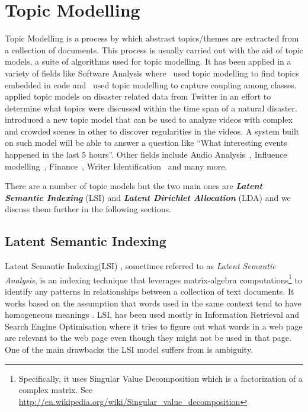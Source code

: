 \section{Topic Modelling}
\label{sec:bg-topic-modelling}
Topic Modelling is a process by which abstract topics/themes are extracted from a collection of
documents. This process is usually carried out with the aid of topic models, a suite of algorithms
used for topic modelling. It has been applied in a variety of fields like Software Analysis
where~\citet{linstead2009software} used topic modelling to find topics embedded in code
and~\citet{gethers2010using} used topic modelling to capture coupling among
classes.~\citet{kireyev2009applications} applied topic models on disaster related data from Twitter
in an effort to determine what topics were discussed within the time span of a natural
disaster.~\citet{hospedales2009markov} introduced a new topic model that can be used to analyze
videos with complex and crowded scenes in other to discover regularities in the videos. A system
built on such model will be able to answer a question like ``What interesting events happened in the
last 5 hours''. Other fields include Audio Analysis~\citep{smaragdis2009topic}, Influence
modelling~\citep{gerrish2009modeling}, Finance~\citep{doyle2009financial}, Writer
Identification~\citep{bhardwaj2009writer} and many more.

There are a number of topic models but the two main ones are \textbf{\textit{Latent Semantic
Indexing}} (LSI) and \textbf{\textit{Latent Dirichlet Allocation}} (LDA) and we discuss them further
in the following sections.


\subsection{Latent Semantic Indexing}
\label{sub:bg-lsa}
Latent Semantic Indexing(LSI) \citep{hofmann1999probabilistic}, sometimes referred to as
\textit{Latent Semantic Analysis}, is an indexing technique that leverages matrix-algebra
computations\footnote{Specifically, it uses Singular Value Decomposition which is a factorization of
a complex matrix. See \url{http://en.wikipedia.org/wiki/Singular_value_decomposition}} to identify
any patterns in relationships between a collection of text documents. It works based on the
assumption that words used in the same context tend to have homogeneous meanings
\citep{deerwester1990indexing,dumais2004latent,landauer2006latent}. LSI, has been used mostly in
Information Retrieval and Search Engine Optimisation where it tries to figure out what words in a
web page are relevant to the web page even though they might not be used in that page. One of the
main drawbacks the LSI model suffers from is ambiguity.

